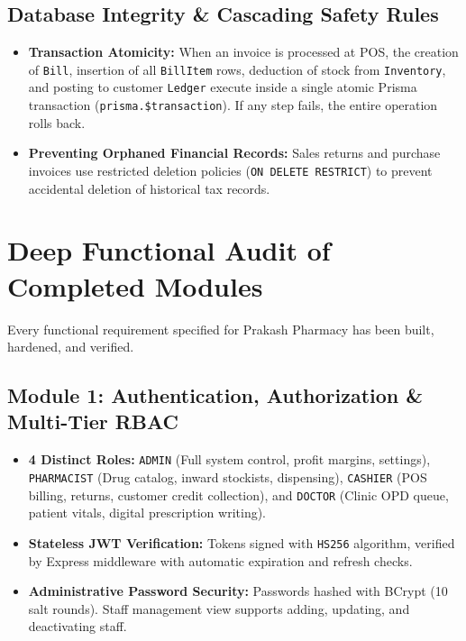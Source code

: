 \documentclass[10pt,a4paper]{article}
\begin{document}
\subsection{Database Integrity \& Cascading Safety Rules}
\begin{itemize}
    \item \textbf{Transaction Atomicity:} When an invoice is processed at POS, the creation of \texttt{Bill}, insertion of all \texttt{BillItem} rows, deduction of stock from \texttt{Inventory}, and posting to customer \texttt{Ledger} execute inside a single atomic Prisma transaction (\texttt{prisma.\$transaction}). If any step fails, the entire operation rolls back.
    \item \textbf{Preventing Orphaned Financial Records:} Sales returns and purchase invoices use restricted deletion policies (\texttt{ON DELETE RESTRICT}) to prevent accidental deletion of historical tax records.
\end{itemize}

\newpage

\section{Deep Functional Audit of Completed Modules}

Every functional requirement specified for Prakash Pharmacy has been built, hardened, and verified.

\subsection{Module 1: Authentication, Authorization \& Multi-Tier RBAC}
\begin{itemize}
    \item \textbf{4 Distinct Roles:} \texttt{ADMIN} (Full system control, profit margins, settings), \texttt{PHARMACIST} (Drug catalog, inward stockists, dispensing), \texttt{CASHIER} (POS billing, returns, customer credit collection), and \texttt{DOCTOR} (Clinic OPD queue, patient vitals, digital prescription writing).
    \item \textbf{Stateless JWT Verification:} Tokens signed with \texttt{HS256} algorithm, verified by Express middleware with automatic expiration and refresh checks.
    \item \textbf{Administrative Password Security:} Passwords hashed with BCrypt (10 salt rounds). Staff management view supports adding, updating, and deactivating staff.
\end{itemize}
\end{document}
